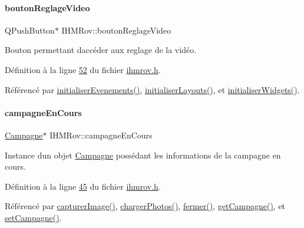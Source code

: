 \paragraph{\texorpdfstring{bouton\+Reglage\+Video}{boutonReglageVideo}}
{\footnotesize\ttfamily Q\+Push\+Button$\ast$ I\+H\+M\+Rov\+::bouton\+Reglage\+Video\hspace{0.3cm}{\ttfamily [private]}}



Bouton permettant d\textquotesingle{}accéder aux reglage de la vidéo. 



Définition à la ligne \hyperlink{ihmrov_8h_source_l00052}{52} du fichier \hyperlink{ihmrov_8h_source}{ihmrov.\+h}.



Référencé par \hyperlink{ihmrov_8cpp_source_l00098}{initialiser\+Evenements()}, \hyperlink{ihmrov_8cpp_source_l00061}{initialiser\+Layouts()}, et \hyperlink{ihmrov_8cpp_source_l00033}{initialiser\+Widgets()}.

\mbox{\label{class_i_h_m_rov_af0475e935531b7331f097ae13d07989b}} 
\paragraph{\texorpdfstring{campagne\+En\+Cours}{campagneEnCours}}
{\footnotesize\ttfamily \hyperlink{class_campagne}{Campagne}$\ast$ I\+H\+M\+Rov\+::campagne\+En\+Cours\hspace{0.3cm}{\ttfamily [private]}}



Instance d\textquotesingle{}un objet \hyperlink{class_campagne}{Campagne} possédant les informations de la campagne en cours. 



Définition à la ligne \hyperlink{ihmrov_8h_source_l00045}{45} du fichier \hyperlink{ihmrov_8h_source}{ihmrov.\+h}.



Référencé par \hyperlink{ihmrov_8cpp_source_l00179}{capturer\+Image()}, \hyperlink{ihmrov_8cpp_source_l00223}{charger\+Photos()}, \hyperlink{ihmrov_8cpp_source_l00253}{fermer()}, \hyperlink{ihmrov_8cpp_source_l00149}{get\+Campagne()}, et \hyperlink{ihmrov_8cpp_source_l00143}{set\+Campagne()}.

\mbox{\label{class_i_h_m_rov_a29f4de081899d8830376f1ad27e74647}} 
